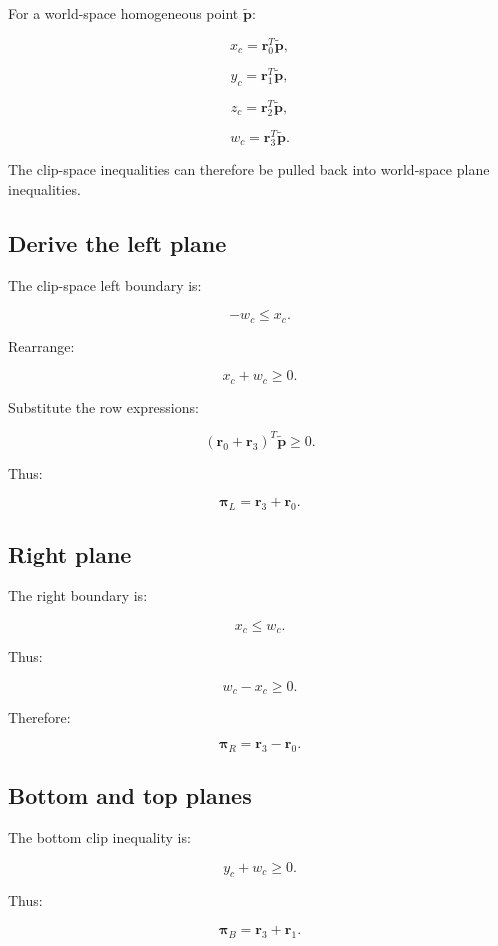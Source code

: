 For a world-space homogeneous point \(\tilde{\mathbf p}\):

\[
 x_c=\mathbf r_0^T\tilde{\mathbf p},
\]

\[
 y_c=\mathbf r_1^T\tilde{\mathbf p},
\]

\[
 z_c=\mathbf r_2^T\tilde{\mathbf p},
\]

\[
 w_c=\mathbf r_3^T\tilde{\mathbf p}.
\]

The clip-space inequalities can therefore be pulled back into world-space plane inequalities.

\subsection{Derive the left plane}\label{02-foundations-ii-ch034-derive-the-left-plane}

The clip-space left boundary is:

\[
 -w_c\le x_c.
\]

Rearrange:

\[
 x_c+w_c\ge0.
\]

Substitute the row expressions:

\[
 (\mathbf r_0+\mathbf r_3)^T\tilde{\mathbf p}\ge0.
\]

Thus:

\[
 \boxed{ \boldsymbol\pi_L=\mathbf r_3+\mathbf r_0 }.
\]

\subsection{Right plane}\label{02-foundations-ii-ch034-right-plane}

The right boundary is:

\[
 x_c\le w_c.
\]

Thus:

\[
 w_c-x_c\ge0.
\]

Therefore:

\[
 \boxed{ \boldsymbol\pi_R=\mathbf r_3-\mathbf r_0 }.
\]

\subsection{Bottom and top planes}\label{02-foundations-ii-ch034-bottom-and-top-planes}

The bottom clip inequality is:

\[
 y_c+w_c\ge0.
\]

Thus:

\[
 \boxed{ \boldsymbol\pi_B=\mathbf r_3+\mathbf r_1 }.
\]

